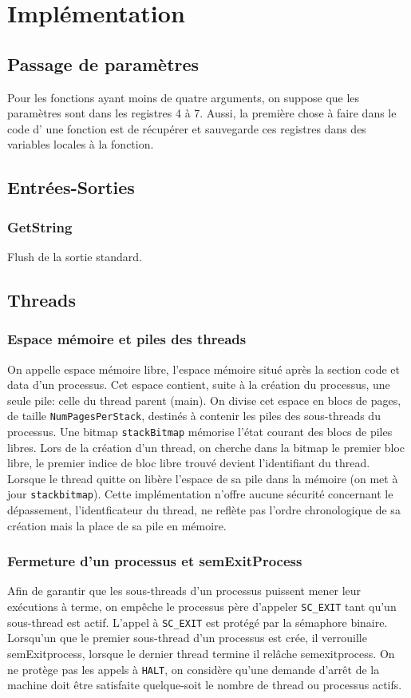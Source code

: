 \documentclass[11pt]{article}
\begin{document}
\section{Implémentation}
\subsection{Passage de paramètres}
Pour les fonctions ayant moins de quatre arguments, on suppose que les paramètres sont dans les registres 4 à 7.
Aussi, la première chose à faire dans le code d' une fonction est de récupérer et sauvegarde ces registres dans des variables locales à la fonction.

\subsection{Entrées-Sorties}
\subsubsection{GetString}
Flush de la sortie standard.

\subsection{Threads}
\subsubsection{Espace mémoire et piles des threads}
On appelle espace mémoire libre, l'espace mémoire situé après la section code et data d'un processus.
Cet espace contient, suite à la création du processus, une seule pile: celle du thread parent (main).
On divise cet espace en blocs de pages, de taille \texttt{NumPagesPerStack}, destinés à contenir les piles des sous-threads du processus.
Une bitmap \texttt{stackBitmap} mémorise l'état courant des blocs de piles libres. Lors de la création d'un thread, on cherche dans la bitmap le premier bloc libre, le premier indice de bloc libre trouvé devient l'identifiant du thread.
Lorsque le thread quitte on libère l'espace de sa pile dans la mémoire (on met à jour \texttt{stackbitmap}).
Cette implémentation n'offre aucune sécurité concernant le dépassement, l'identficateur du thread, ne reflète pas l'ordre chronologique de sa création mais la place de sa pile en mémoire.

\subsubsection{Fermeture d'un processus et semExitProcess}
Afin de garantir que les sous-threads d'un processus puissent mener leur exécutions à terme, on empêche
le processus père d'appeler \texttt{SC\_EXIT} tant qu'un sous-thread est actif. L'appel à \texttt{SC\_EXIT} est protégé par la sémaphore binaire.
Lorsqu'un que le premier sous-thread d'un processus est crée, il verrouille semExitprocess, lorsque le dernier thread termine il relâche semexitprocess.
On ne protège pas les appels à \texttt{HALT}, on considère qu'une demande d'arrêt de la machine doit être satisfaite quelque-soit le nombre de thread ou processus actifs.
\end{document}
